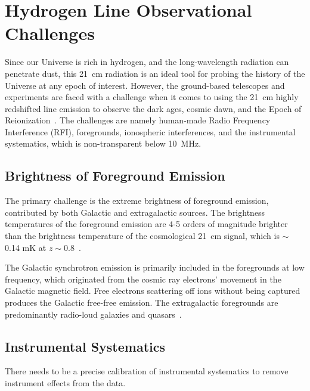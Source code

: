 	    \section{Hydrogen Line Observational Challenges}
	    
	    
	    Since our Universe is rich in hydrogen, and the long-wavelength radiation can penetrate dust, this \SI{21}{cm} radiation is an ideal tool for probing the history of the Universe at any epoch of interest. However, the ground-based telescopes and experiments are faced with a challenge when it comes to using the \SI{21}{cm} highly redshifted line emission to observe the dark ages, cosmic dawn, and the Epoch of Reionization~\citep{2016ExA....41..271R}. The challenges are namely human-made Radio Frequency Interference (RFI), foregrounds, ionospheric interferences, and the instrumental systematics, which is non-transparent below \SI{10}{MHz}. 
	    
	    \subsection*{Brightness of Foreground Emission}
	    
	    The	primary challenge is the extreme brightness of foreground emission, contributed by both Galactic and extragalactic sources.
	    The brightness temperatures of the foreground emission are 4-5 orders of magnitude brighter than the brightness temperature of the cosmological \SI{21}{cm} signal, which is $\sim$ 0.14 mK at $z\sim0.8$~\citep{2018RAA....18..114H}.
	    
	    The Galactic synchrotron emission is primarily included in the foregrounds at low frequency, which originated from the cosmic ray electrons' movement in the Galactic magnetic field. Free electrons scattering off ions without being captured produces the Galactic free-free emission. The extragalactic foregrounds are predominantly radio-loud galaxies and quasars~\citep{2018RAA....18..114H, 2008MNRAS.389.1319J}.
	    
	    \subsection*{Instrumental Systematics}
	    
	    There needs to be a precise calibration of instrumental systematics to remove instrument effects from the data.
	    
